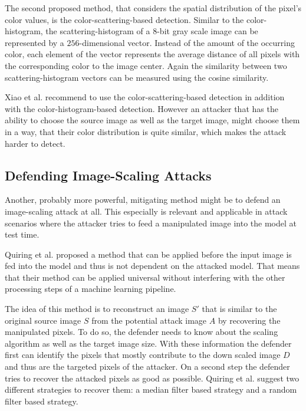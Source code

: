 \documentclass[sigconf]{acmart}
\begin{document}
The second proposed method, that considers the spatial distribution of the pixel's color values, is the color-scattering-based detection.
Similar to the color-histogram, the scattering-histogram of a $8$-bit gray scale image can be represented by a $256$-dimensional vector.
Instead of the amount of the occurring color, each element of the vector represents the average distance of all pixels with the corresponding color to the image center.
Again the similarity between two scattering-histogram vectors can be measured using the cosine similarity.

Xiao et al. recommend to use the color-scattering-based detection in addition with the color-histogram-based detection.
However an attacker that has the ability to choose the source image as well as the target image, might choose them in a way, that their color distribution is quite similar, which makes the attack harder to detect.

\subsection{Defending Image-Scaling Attacks}
Another, probably more powerful, mitigating method might be to defend an image-scaling attack at all.
This especially is relevant and applicable in attack scenarios where the attacker tries to feed a manipulated image into the model at test time.

Quiring et al.\cite{imgscale} proposed a method that can be applied before the input image is fed into the model and thus is not dependent on the attacked model.
That means that their method can be applied universal without interfering with the other processing steps of a machine learning pipeline.

The idea of this method is to reconstruct an image $S'$ that is similar to the original source image $S$ from the potential attack image $A$ by recovering the manipulated pixels.
To do so, the defender needs to know about the scaling algorithm as well as the target image size.
With these information the defender first can identify the pixels that mostly contribute to the down scaled image $D$ and thus are the targeted pixels of the attacker.
On a second step the defender tries to recover the attacked pixels as good as possible.
Quiring et al. suggest two different strategies to recover them: a median filter based strategy and a random filter based strategy.

\smallbreak
\end{document}
